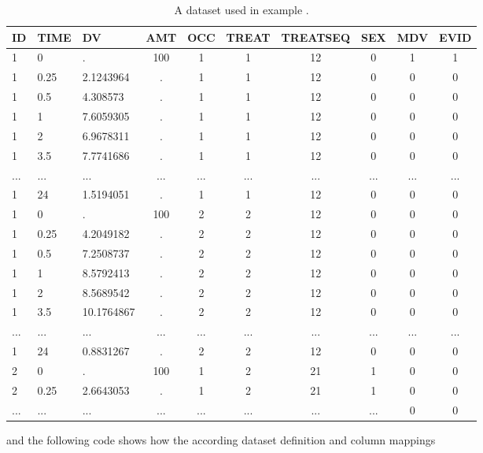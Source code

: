 \begin{table}[htdp]
\begin{center}
\small
\begin{tabular}{lllccccccc}\toprule
ID	& TIME	& DV			& AMT	& OCC	& TREAT	& TREATSEQ	& SEX 	& MDV 	& EVID \\ \midrule
1	& 0		& .			& 100	& 1		& 1		& 12			& 0 		& 1		& 1 \\ 
1	& 0.25	& 2.1243964	& .		& 1		& 1		& 12			& 0 		& 0		& 0 \\ 
1	& 0.5	& 4.308573	& .		& 1		& 1		& 12			& 0 		& 0		& 0  \\ 
1	& 1		& 7.6059305	& .		& 1		& 1		& 12			& 0 		& 0		& 0  \\ 
1	& 2		& 6.9678311	& .		& 1		& 1		& 12			& 0 		& 0		& 0  \\ 
1	& 3.5	& 7.7741686	& .		& 1		& 1		& 12			& 0 		& 0		& 0  \\ 
...	& ...		& ...			& ...		& ...		&...		& ...			& ... 		& ...		& ...  \\
1	& 24		& 1.5194051	& .		& 1		& 1		& 12			& 0 		& 0		& 0  \\ 
1	& 0		& .			& 100	& 2		& 2		& 12			& 0 		& 0		& 0  \\ 
1	& 0.25	& 4.2049182	& .		& 2		& 2		& 12			& 0 		& 0		& 0  \\ 
1	& 0.5	& 7.2508737	& .		& 2		& 2		& 12			& 0 		& 0		& 0  \\ 
1	& 1		& 8.5792413	& .		& 2		& 2		& 12			& 0 		& 0		& 0  \\ 
1	& 2		& 8.5689542	& .		& 2		& 2		& 12			& 0 		& 0		& 0  \\ 
1	& 3.5	& 10.1764867	& .		& 2		& 2		& 12			& 0 		& 0		& 0  \\ 
...	& ...		& ...			& ...		& ...		&...		& ...			& ... 		& ...		& ...  \\
1	& 24		& 0.8831267	& .		& 2		& 2		& 12			& 0 		& 0		& 0  \\ 
2	& 0		& .			& 100	& 1		& 2		& 21			& 1 		& 0		& 0  \\ 
2	& 0.25	& 2.6643053	& .		& 1		& 2		& 21			& 1 		& 0		& 0  \\ 
...	& ...		& ...			& ...		& ...		&...		& ...			& ... 		& 0		& 0  \\ \bottomrule
\end{tabular}
\end{center}
\caption{A dataset used in example \theexamples.}
\label{tab:example4_dataSet}
\end{table}%
and the following code shows how the according dataset definition and column mappings 
